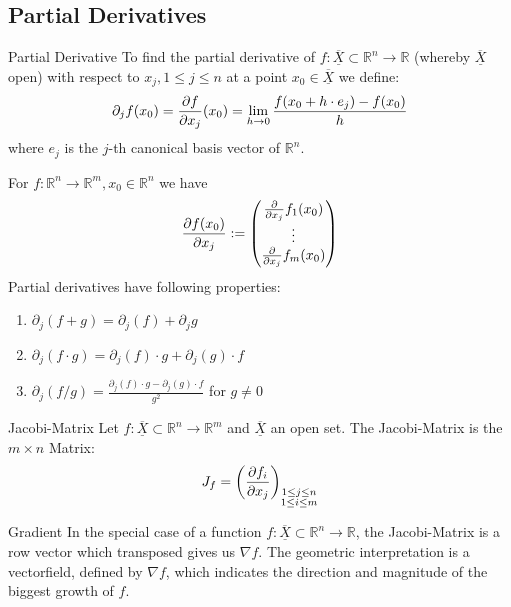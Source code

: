 \documentclass[a4paper,fontsize = 8pt]{scrartcl}
\def\R{\mathbb{R}}
\def\X{\underline{\overline{X}}}
\begin{document}
\subsection{Partial Derivatives}
\begin{mainbox}{Partial Derivative}
    To find the partial derivative of \(f: \X \subset \R^n \to \R\) (whereby \(\X\) open) with respect to $x_j, 1 \leq j \leq n$ at a point $x_0 \in \X$ we define:
\[\partial_j f (x_0)= \pdv{f}{x_{j}}(x_0) = \lim_{h \to 0} \frac{f(x_0 + h\cdot e_j) - f(x_0)}{h}\]where $e_j$ is the $j$-th canonical basis vector of $\R^n$.
\end{mainbox}
 
For \(f: \R^n \to \R^m, x_0 \in \R^n\) we have
\begin{align*}
  \pdv{f(x_0)}{x_j} := \begin{pmatrix}
    \pdv*{f_1(x_0)}{x_j}\\
    \vdots\\
    \pdv*{f_m(x_0)}{x_j}\\
  \end{pmatrix}
\end{align*}
Partial derivatives have following properties:
\begin{enumerate}
  \item \(\partial_j(f + g) = \partial_j (f) + \partial_j g\)
  \item \(\partial_j(f \cdot g) = \partial_j (f) \cdot g + \partial_j (g) \cdot f\)
  \item \(\partial_j(f / g) = \frac{\partial_j (f) \cdot g - \partial_j (g) \cdot f}{g^2}\) for \(g \ne 0\)
\end{enumerate}
\begin{mainbox}{Jacobi-Matrix}
Let \(f: \X \subset \R^n \to \R^m\) and \(\X\) an open set. The Jacobi-Matrix is the \(m \times n\) Matrix:
\[J_f = \left( \pdv{f_i}{x_j} \right)_{\substack{1 \leq j \leq n \\ 1 \leq i \leq m}}\]
\end{mainbox}
\begin{mainbox}{Gradient}
    In the special case of a function \(f: \X \subset \R^n \to \R\), the Jacobi-Matrix is a row vector which transposed gives us \(\nabla f\). The geometric interpretation is a vectorfield, defined by $\nabla f$, which indicates the direction and magnitude of the biggest growth of $f$. 
\end{mainbox}

\end{document}
